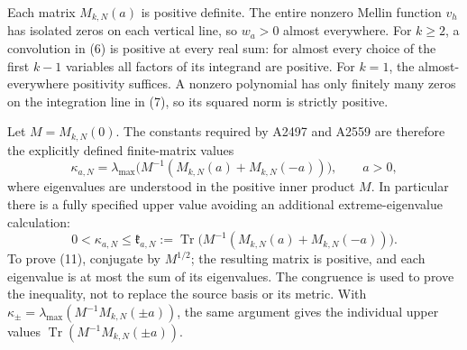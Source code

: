 \documentclass[11pt]{article}
\newcommand{\tr}{\operatorname{Tr}}
\begin{document}
Each matrix \(M_{k,N}(a)\) is positive definite. The entire nonzero
Mellin function \(v_h\) has isolated zeros on each vertical line, so
\(w_a>0\) almost everywhere. For \(k\ge2\), a convolution in (6)
is positive at every real sum: for almost every choice of the first
\(k-1\) variables all factors of its integrand are positive. For
\(k=1\), the almost-everywhere positivity suffices. A nonzero
polynomial has only finitely many zeros on the integration line in
(7), so its squared norm is strictly positive.

Let \(M=M_{k,N}(0)\). The constants required by A2497 and A2559 are
therefore the explicitly defined finite-matrix values
\[
 \kappa_{a,N}=\lambda_{\max}
       \bigl(M^{-1}(M_{k,N}(a)+M_{k,N}(-a))\bigr),\qquad a>0,
 \tag{10}
\]
where eigenvalues are understood in the positive inner product \(M\).
In particular there is a fully specified upper value avoiding an
additional extreme-eigenvalue calculation:
\[
 0<\kappa_{a,N}\le
 \mathfrak k_{a,N}:=
 \tr\bigl(M^{-1}(M_{k,N}(a)+M_{k,N}(-a))\bigr).
 \tag{11}
\]
To prove (11), conjugate by \(M^{1/2}\); the resulting matrix is
positive, and each eigenvalue is at most the sum of its eigenvalues.
The congruence is used to prove the inequality, not to replace the
source basis or its metric. With
\(\kappa_\pm=\lambda_{\max}(M^{-1}M_{k,N}(\pm a))\), the same
argument gives the individual upper values
\(\tr(M^{-1}M_{k,N}(\pm a))\).
\end{document}
